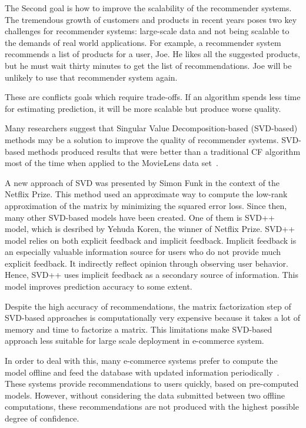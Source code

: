 \documentclass[oneside,13pt]{extreport}
\begin{document}
The Second goal is how to improve the scalability of the recommender systems. The tremendous growth of customers and products in recent years poses two key challenges for recommender systems: large-scale data and not being scalable to the demands of real world applications. For example, a recommender system recommends a list of products for a user, Joe. He likes all the suggested products, but he must wait thirty minutes to get the list of recommendations. Joe will be unlikely to use that recommender system again. 

These are conflicts goals which require trade-offs. If an algorithm spends less time for estimating prediction, it will be more scalable but produce worse quality. 

Many researchers suggest that Singular Value Decomposition-based (SVD-based) methods may be a solution to improve the quality of recommender systems. SVD-based methods produced results that were better than a traditional CF algorithm most of the time when applied to the MovieLens data set~\cite{sarwar2000application}. 

A new approach of SVD was presented by Simon Funk in the context of the Netflix Prize\cite{funk2006netflix}. This method used an approximate way to compute the low-rank approximation of the matrix by minimizing the squared error loss. Since then, many other SVD-based models have been created. One of them is SVD++ model, which is desribed by Yehuda Koren, the winner of Netflix Prize. SVD++ model relies on both explicit feedback and implicit feedback\cite{koren2008factorization}. Implicit feedback is an especially valuable information source for users who do not provide much explicit feedback. It indirectly reflect opinion through observing user behavior. Hence, SVD++ uses implicit feedback as a secondary source of information. This model improves prediction accuracy to some extent.

Despite the high accuracy of recommendations, the matrix factorization step of SVD-based approaches is computationally very expensive because it takes a lot of memory and time to factorize a matrix. This limitations make SVD-based approach less suitable for large scale deployment in e-commerce system. 

In order to deal with this, many e-commerce systems prefer to compute the model offline and feed the database with updated information periodically~\cite{linden2003amazon}. These systems provide recommendations to users quickly, based on pre-computed models. However, without considering the data submitted between two offline computations, these recommendations  are not produced with the highest possible degree of confidence. 
\end{document}
